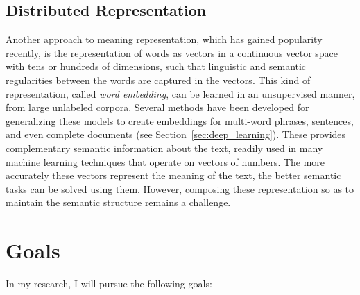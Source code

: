 \documentclass[12pt]{article}
\newcommand{\secref}[1]{Section~\ref{#1}}
\begin{document}

\subsection{Distributed Representation}\label{sec:distributed}

Another approach to meaning representation, which has gained popularity recently, is the
representation of words as vectors in a continuous vector space with tens or
hundreds of dimensions\cite{turian2010word}, such that linguistic and semantic
regularities between the words are captured in the
vectors\cite{mikolov2013linguistic}. This kind of representation, called
\textit{word embedding}, can be learned in an unsupervised manner, from large
unlabeled corpora.
Several methods have been developed for generalizing these models to create embeddings
for multi-word phrases, sentences, and even complete documents (see \secref{sec:deep_learning}).
These provides complementary semantic information about the text,
readily used in many machine learning techniques that operate on vectors of numbers.
The more accurately these vectors represent the meaning of the text, the better semantic tasks
can be solved using them.
However, composing these representation so as to maintain the semantic structure remains a challenge.



\section{Goals}\label{sec:goals}

In my research, I will pursue the following goals:
\end{document}
